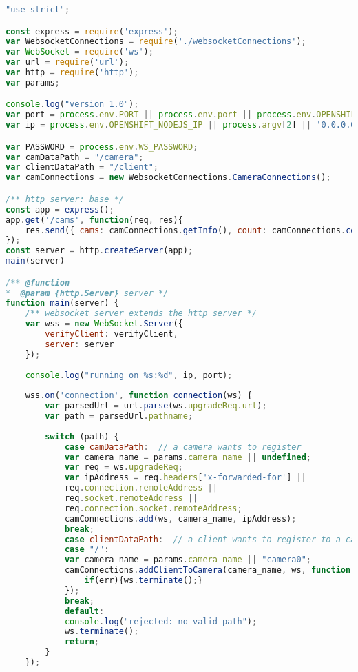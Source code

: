 \documentclass[hidelinks,11pt,a4paper,oneside,article]{memoir}
\begin{document}
\begin{lstlisting}[label={listing:nodejsmain},caption={Main file},language=JavaScript, style=styleprogramming]
"use strict";

const express = require('express');
var WebsocketConnections = require('./websocketConnections');
var WebSocket = require('ws');
var url = require('url');
var http = require('http');
var params;

console.log("version 1.0");
var port = process.env.PORT || process.env.port || process.env.OPENSHIFT_NODEJS_PORT || 8080;
var ip = process.env.OPENSHIFT_NODEJS_IP || process.argv[2] || '0.0.0.0';

var PASSWORD = process.env.WS_PASSWORD;
var camDataPath = "/camera";
var clientDataPath = "/client";
var camConnections = new WebsocketConnections.CameraConnections();

/** http server: base */
const app = express();
app.get('/cams', function(req, res){
    res.send({ cams: camConnections.getInfo(), count: camConnections.count()});
});
const server = http.createServer(app);
main(server)

/** @function
*  @param {http.Server} server */
function main(server) {
    /** websocket server extends the http server */
    var wss = new WebSocket.Server({
        verifyClient: verifyClient,
        server: server
    });
    
    console.log("running on %s:%d", ip, port);
    
    wss.on('connection', function connection(ws) {
        var parsedUrl = url.parse(ws.upgradeReq.url);
        var path = parsedUrl.pathname;
        
        switch (path) {
            case camDataPath:  // a camera wants to register
            var camera_name = params.camera_name || undefined;
            var req = ws.upgradeReq;
            var ipAddress = req.headers['x-forwarded-for'] || 
            req.connection.remoteAddress || 
            req.socket.remoteAddress ||
            req.connection.socket.remoteAddress;
            camConnections.add(ws, camera_name, ipAddress);
            break;
            case clientDataPath:  // a client wants to register to a camera
            case "/":
            var camera_name = params.camera_name || "camera0";
            camConnections.addClientToCamera(camera_name, ws, function(err){
                if(err){ws.terminate();}
            });
            break;
            default:
            console.log("rejected: no valid path");
            ws.terminate();
            return;
        }
    });
    

\end{lstlisting}
\end{document}

